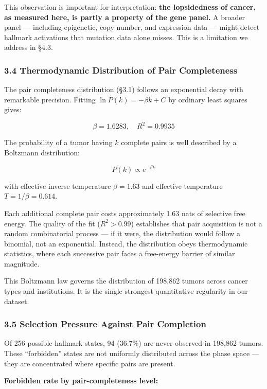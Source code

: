 \documentclass[
  11pt,
]{article}
\begin{document}
This observation is important for interpretation: \textbf{the
lopsidedness of cancer, as measured here, is partly a property of the
gene panel.} A broader panel --- including epigenetic, copy number, and
expression data --- might detect hallmark activations that mutation data
alone misses. This is a limitation we address in §4.3.

\subsubsection{3.4 Thermodynamic Distribution of Pair
Completeness}\label{thermodynamic-distribution-of-pair-completeness}

The pair completeness distribution (§3.1) follows an exponential decay
with remarkable precision. Fitting \(\ln P(k) = -\beta k + C\) by
ordinary least squares gives:

\[\beta = 1.6283, \quad R^2 = 0.9935 \tag{2}\]

The probability of a tumor having \(k\) complete pairs is well described
by a Boltzmann distribution:

\[P(k) \propto e^{-\beta k} \tag{3}\]

with effective inverse temperature \(\beta = 1.63\) and effective
temperature \(T = 1/\beta = 0.614\).

Each additional complete pair costs approximately 1.63 nats of selective
free energy. The quality of the fit (\(R^2 > 0.99\)) establishes that
pair acquisition is not a random combinatorial process --- if it were,
the distribution would follow a binomial, not an exponential. Instead,
the distribution obeys thermodynamic statistics, where each successive
pair faces a free-energy barrier of similar magnitude.

This Boltzmann law governs the distribution of 198,862 tumors across
cancer types and institutions. It is the single strongest quantitative
regularity in our dataset.

\subsubsection{3.5 Selection Pressure Against Pair
Completion}\label{selection-pressure-against-pair-completion}

Of 256 possible hallmark states, 94 (36.7\%) are never observed in
198,862 tumors. These ``forbidden'' states are not uniformly distributed
across the phase space --- they are concentrated where specific pairs
are present.

\textbf{Forbidden rate by pair-completeness level:}
\end{document}
